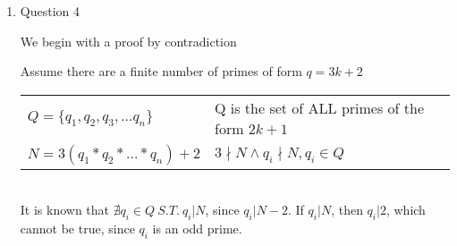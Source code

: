 \documentclass[11pt]{article}
\def\AND{\wedge}
\begin{document}
\begin{enumerate}
\begin{tabular}{ll}
			$3 * (15 - 1 * 11) - 1 * 11$ & $3 * 15 - 4 * 11$ \\

			$3 * 15 - 4 * (41 - 2 * 15)$ & $11 * 15 - 4 * 41$ \\

			$11 * (138 - 3 * 41) - 4 * 41$ & $11 * 138 - 37 * 41$ \\

			$11 * 138 - 37 * (179 - 1 * 138)$ & $48 * 138 - 37 * 179$ \\

			$48 * (1033 - 5 * 179) - 37 * 179$ & $48 * 1033 - 277 * 179$ \\
			
			$48 * 1033 - 277 * (1212 - 1 * 1033)$ & $325 * 1033 - 277 * 1212$ \\

			$325 * (3457 - 2 * 1212) - 277 * 1212$ & $325 * 3457 - 927 * 1212$ \\

			$325 * 3457 - 927 * (4669 - 1 * 3457) & 1252 * 3457 - 927 * 4669 = 1$ \\

		\end{tabular}

		Bazout Coefficients: $s = 1252, t = -927$ \\ 

		\newpage

		\textbf{Alexander Garcia}

		24 February 2017 \\

	\item Question 4

		We begin with a proof by contradiction

		Assume there are a finite number of primes of form $q = 3k + 2$ \\

		\begin{tabular}{ll}

			$Q = \{q_1, q_2, q_3, \dots q_n\}$ & Q is the set of ALL primes of 
							     the form $2k + 1$ \\

			$N = 3(q_1*q_2*\dots*q_n)+2$ & $3 \nmid N \AND q_i \nmid N, q_i \in Q$ \\ 

		\end{tabular} \\

		It is known that $\nexists q_i \in Q\ S.T.\ q_i | N$, since $q_i | N-2$.
		If $q_i | N$, then $q_i | 2$, which cannot be true, since $q_i$ is an odd prime.


\end{enumerate}
\end{document}
